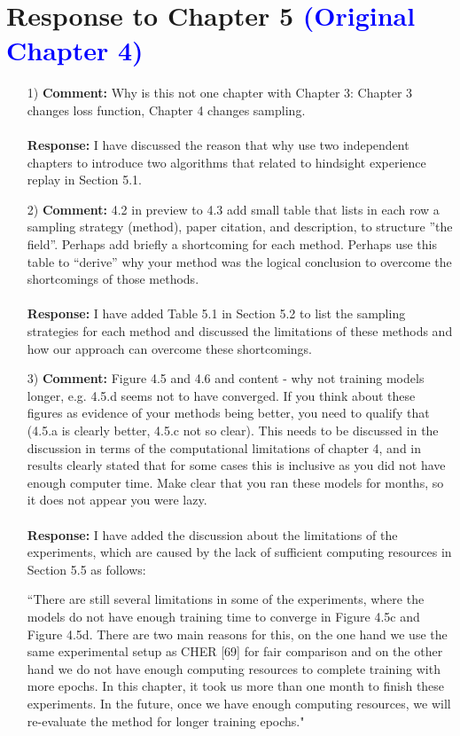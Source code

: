\documentclass[11pt]{article}
\begin{document}
\newpage
\section*{Response to Chapter 5 \textcolor{blue}{(Original Chapter 4)}}
\begin{enumerate}
\item[1)] \textbf{Comment:} Why is this not one chapter with Chapter 3:
Chapter 3 changes loss function, Chapter 4 changes sampling.\\ \\
\textbf{Response:} I have discussed the reason that why use two independent chapters to introduce two algorithms that related to hindsight experience replay in Section 5.1.

\item[2)] \textbf{Comment:} 4.2 in preview to 4.3 add small table that lists in each row a sampling strategy (method), paper citation, and description, to structure ”the field”. Perhaps add briefly a shortcoming for each method. Perhaps use this table to “derive” why your method was the logical conclusion to overcome the shortcomings of those methods.\\ \\
\textbf{Response:} I have added Table 5.1 in Section 5.2 to list the sampling strategies for each method and discussed the limitations of these methods and how our approach can overcome these shortcomings.

\item[3)] \textbf{Comment:} Figure 4.5 and 4.6 and content - why not training models longer, e.g. 4.5.d seems not to have converged. If you think about these figures as evidence of your methods being better, you need to qualify that (4.5.a is clearly better, 4.5.c not so clear). This needs to be discussed in the discussion in terms of the computational limitations of chapter 4, and in results clearly stated that for some cases this is inclusive as you did not have enough computer time. Make clear that you ran these models for months, so it does not appear you were lazy.\\ \\
\textbf{Response:} I have added the discussion about the limitations of the experiments, which are caused by the lack of sufficient computing resources in Section 5.5 as follows:

``There are still several limitations in some of the experiments, where the models do not have enough training time to converge in Figure 4.5c and Figure 4.5d. There are two main reasons for this, on the one hand we use the same experimental setup as CHER [69] for fair comparison and on the other hand we do not have enough computing resources to complete training with more epochs. In this chapter, it took us more than one month to finish these experiments. In the future, once we have enough computing resources, we will re-evaluate the method for longer training epochs."


\end{enumerate}
\end{document}
